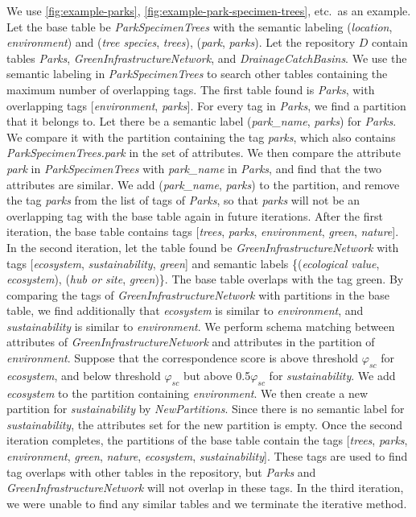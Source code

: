 We use \autoref{fig:example-parks}, \autoref{fig:example-park-specimen-trees}, etc.~as an example. Let the base table be \textit{ParkSpecimenTrees} with the semantic labeling (\textit{location}, \textit{environment}) and (\textit{tree species}, \textit{trees}), (\textit{park}, \textit{parks}). Let the repository $D$ contain tables \textit{Parks}, \textit{GreenInfrastructureNetwork}, and \textit{DrainageCatchBasins}. We use the semantic labeling in \textit{ParkSpecimenTrees} to search other tables containing the maximum number of overlapping tags. The first table found is \textit{Parks}, with overlapping tags [\textit{environment}, \textit{parks}]. For every tag in \textit{Parks}, we find a partition that it belongs to. Let there be a semantic label (\textit{park\_name}, \textit{parks}) for \textit{Parks}. We compare it with the partition containing the tag \textit{parks}, which also contains \textit{ParkSpecimenTrees.park} in the set of attributes. We then compare the attribute \textit{park} in \textit{ParkSpecimenTrees} with \textit{park\_name} in \textit{Parks}, and find that the two attributes are similar. We add (\textit{park\_name}, \textit{parks}) to the partition, and remove the tag \textit{parks} from the list of tags of \textit{Parks}, so that \textit{parks} will not be an overlapping tag with the base table again in future iterations. After the first iteration, the base table contains tags [\textit{trees}, \textit{parks}, \textit{environment}, \textit{green}, \textit{nature}]. In the second iteration, let the table found be \textit{GreenInfrastructureNetwork} with tags [\textit{ecosystem}, \textit{sustainability}, \textit{green}] and semantic labels \{(\textit{ecological value}, \textit{ecosystem}), (\textit{hub or site}, \textit{green})\}. The base table overlaps with the tag green. By comparing the tags of \textit{GreenInfrastructureNetwork} with partitions in the base table, we find additionally that \textit{ecosystem} is similar to \textit{environment}, and \textit{sustainability} is similar to \textit{environment}. We perform schema matching between attributes of \textit{GreenInfrastructureNetwork} and attributes in the partition of \textit{environment}. Suppose that the correspondence score is above threshold $\ensuremath{\varphi}_{sc}$ for \textit{ecosystem}, and below threshold $\ensuremath{\varphi}_{sc}$ but above 0.5$\ensuremath{\varphi}_{sc}$ for \textit{sustainability}. We add \textit{ecosystem} to the partition containing \textit{environment}. We then create a new partition for \textit{sustainability} by \textit{NewPartitions}. Since there is no semantic label for \textit{sustainability}, the attributes set for the new partition is empty. Once the second iteration completes, the partitions of the base table contain the tags [\textit{trees}, \textit{parks}, \textit{environment}, \textit{green}, \textit{nature}, \textit{ecosystem}, \textit{sustainability}]. These tags are used to find tag overlaps with other tables in the repository, but \textit{Parks} and \textit{GreenInfrastructureNetwork} will not overlap in these tags. In the third iteration, we were unable to find any similar tables and we terminate the iterative method.

